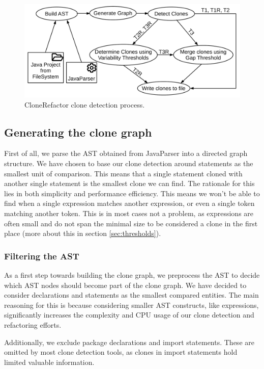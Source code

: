 \begin{figure}[H]
  \centering
  \includegraphics[width=1\columnwidth]{img/CloneDetection}
  \caption{CloneRefactor clone detection process.}
  \label{fig:clonedetection}
\end{figure}

\subsection{Generating the clone graph}\label{sec:clonegraph}
First of all, we parse the AST obtained from JavaParser into a directed graph structure. We have chosen to base our clone detection around statements as the smallest unit of comparison. This means that a single statement cloned with another single statement is the smallest clone we can find. The rationale for this lies in both simplicity and performance efficiency. This means we won't be able to find when a single expression matches another expression, or even a single token matching another token. This is in most cases not a problem, as expressions are often small and do not span the minimal size to be considered a clone in the first place (more about this in section \ref{sec:thresholds}).

\subsubsection{Filtering the AST}
As a first step towards building the clone graph, we preprocess the AST to decide which AST nodes should become part of the clone graph. We have decided to consider declarations and statements as the smallest compared entities. The main reasoning for this is because considering smaller AST constructs, like expressions, significantly increases the complexity and CPU usage of our clone detection and refactoring efforts.

Additionally, we exclude package declarations and import statements. These are omitted by most clone detection tools, as clones in import statements hold limited valuable information.

